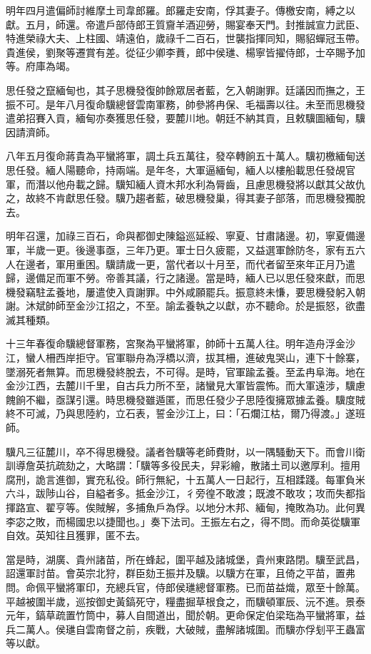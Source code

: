 \begin{pinyinscope}
明年四月遣偏師討維摩土司韋郎羅。郎羅走安南，俘其妻子。傳檄安南，縛之以獻。五月，師還。帝遣戶部侍郎王質齎羊酒迎勞，賜宴奉天門。封推誠宣力武臣、特進榮祿大夫、上柱國、靖遠伯，歲祿千二百石，世襲指揮同知，賜貂蟬冠玉帶。貴進侯，劉聚等遷賞有差。從征少卿李蕡，郎中侯璡、楊寧皆擢侍郎，士卒賜予加等。府庫為竭。

思任發之竄緬甸也，其子思機發復帥餘眾居者藍，乞入朝謝罪。廷議因而撫之，王振不可。是年八月復命驥總督雲南軍務，帥參將冉保、毛福壽以往。未至而思機發遣弟招賽入貢，緬甸亦奏獲思任發，要麓川地。朝廷不納其貢，且敕驥圖緬甸，驥因請濟師。

八年五月復命蔣貴為平蠻將軍，調土兵五萬往，發卒轉餉五十萬人。驥初檄緬甸送思任發。緬人陽聽命，持兩端。是年冬，大軍逼緬甸，緬人以樓船載思任發覘官軍，而潛以他舟載之歸。驥知緬人資木邦水利為脣齒，且慮思機發將以獻其父故仇之，故終不肯獻思任發。驥乃趨者藍，破思機發巢，得其妻子部落，而思機發獨脫去。

明年召還，加祿三百石，命與都御史陳鎰巡延綏、寧夏、甘肅諸邊。初，寧夏備邊軍，半歲一更。後邊事亟，三年乃更。軍士日久疲罷，又益選軍餘防冬，家有五六人在邊者，軍用重困。驥請歲一更，當代者以十月至，而代者留至來年正月乃遣歸，邊備足而軍不勞。帝善其議，行之諸邊。當是時，緬人已以思任發來獻，而思機發竊駐孟養地，屢遣使入貢謝罪。中外咸願罷兵。振意終未慊，要思機發躬入朝謝。沐斌帥師至金沙江招之，不至。諭孟養執之以獻，亦不聽命。於是振怒，欲盡滅其種類。

十三年春復命驥總督軍務，宮聚為平蠻將軍，帥師十五萬人往。明年造舟浮金沙江，蠻人柵西岸拒守。官軍聯舟為浮橋以濟，拔其柵，進破鬼哭山，連下十餘寨，墜溺死者無算。而思機發終脫去，不可得。是時，官軍踰孟養。至孟冉阜海。地在金沙江西，去麓川千里，自古兵力所不至，諸蠻見大軍皆震怖。而大軍遠涉，驥慮餽餉不繼，亟謀引還。時思機發雖遁匿，而思任發少子思陸復擁眾據孟養。驥度賊終不可滅，乃與思陸約，立石表，誓金沙江上，曰：「石爛江枯，爾乃得渡。」遂班師。

驥凡三征麓川，卒不得思機發。議者咎驥等老師費財，以一隅騷動天下。而會川衛訓導詹英抗疏劾之，大略謂：「驥等多役民夫，舁彩繪，散諸土司以邀厚利。擅用腐刑，詭言進御，實充私役。師行無紀，十五萬人一日起行，互相蹂踐。每軍負米六斗，跋陟山谷，自縊者多。抵金沙江，彳旁徨不敢渡；既渡不敢攻；攻而失都指揮路宣、翟亨等。俟賊解，多捕魚戶為俘。以地分木邦、緬甸，掩敗為功。此何異李宓之敗，而楊國忠以捷聞也。」奏下法司。王振左右之，得不問。而命英從驥軍自效。英知往且獲罪，匿不去。

當是時，湖廣、貴州諸苗，所在蜂起，圍平越及諸城堡，貴州東路閉。驥至武昌，詔還軍討苗。會英宗北狩，群臣劾王振并及驥。以驥方在軍，且倚之平苗，置弗問。命佩平蠻將軍印，充總兵官，侍郎侯璡總督軍務。已而苗益熾，眾至十餘萬。平越被圍半歲，巡按御史黃鎬死守，糧盡掘草根食之，而驥頓軍辰、沅不進。景泰元年，鎬草疏置竹筒中，募人自間道出，聞於朝。更命保定伯梁珤為平蠻將軍，益兵二萬人。侯璡自雲南督之前，疾戰，大破賊，盡解諸城圍。而驥亦俘刬平王蟲富等以獻。


\end{pinyinscope}
